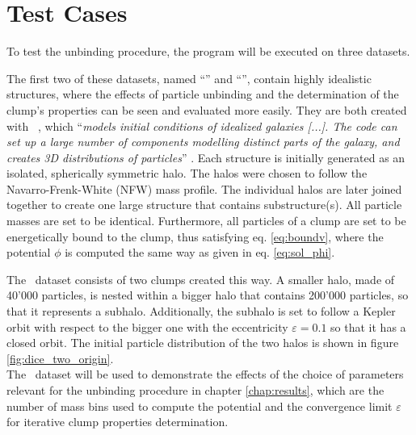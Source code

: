 \section{Test Cases}\label{chap:datasets}

To test the unbinding procedure, the program will be executed on three datasets.





The first two of these datasets, named ``\dt'' and ``\ds'', contain highly idealistic structures, where the effects of particle unbinding and the determination of the clump's properties can be seen and evaluated more easily.
They are both created with \dice\ \parencite{DICE}, which ``\textit{models initial conditions of idealized galaxies [...]. The code can set up a large number of components modelling distinct parts of the galaxy, and creates 3D distributions of particles}'' \parencite{DICE}.
Each structure is initially generated as an isolated, spherically symmetric halo.
The halos were chosen to follow the Navarro-Frenk-White (NFW) mass profile.
The individual halos are later joined together to create one large structure that contains substructure(s).
All particle masses are set to be identical.
Furthermore, all particles of a clump are set to be energetically bound to the clump, thus satisfying eq. \eqref{eq:boundv}, where the potential $\phi$ is computed the same way as given in eq. \eqref{eq:sol_phi}.



The \dt\ dataset consists of two clumps created this way.
A smaller halo, made of 40'000 particles, is nested within a bigger halo that contains 200'000 particles, so that it represents a subhalo.
Additionally, the subhalo is set to follow a Kepler orbit with respect to the bigger one with the eccentricity $\varepsilon = 0.1$ so that it has a closed orbit.
The initial particle distribution of the two halos is shown in figure \ref{fig:dice_two_origin}.\\
%
The \dt\ dataset will be used to demonstrate the effects of the choice of parameters relevant for the unbinding procedure in chapter \ref{chap:results}, which are the number of mass bins used to compute the potential and the convergence limit $\varepsilon$ for iterative clump properties determination.





